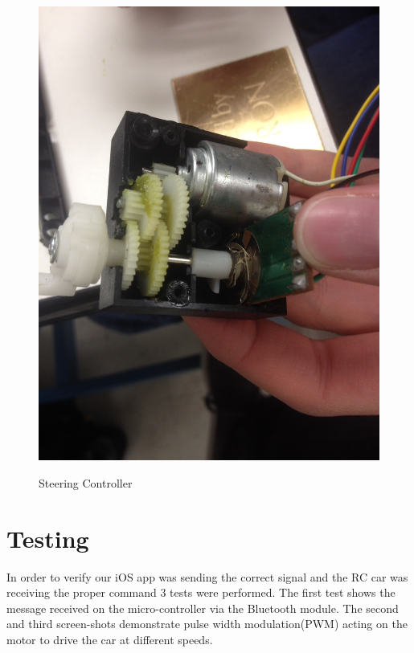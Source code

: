\documentclass[12pt]{article}
\begin{document}
\begin{figure}[H]
\begin {center}
\includegraphics[scale=.10]{encoder}\\
\caption{Steering Controller}
\end {center}
\end{figure}


\section{Testing}
In order to verify our iOS app was sending the correct signal and the RC car was receiving the proper command 3 tests were performed. The first test shows the message received on the micro-controller via the Bluetooth module. The second and third screen-shots demonstrate pulse width modulation(PWM) acting on the motor to drive the car at different speeds.\\
\end{document}
